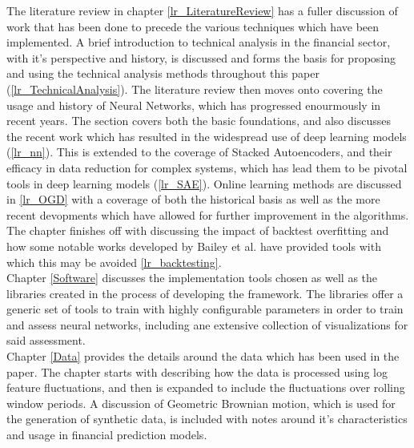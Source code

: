 \documentclass[a4paper,11pt,oneside]{article}
\theoremstyle{plain}
\theoremstyle{definition}
\begin{document}
	The literature review in chapter \ref{lr_LiteratureReview} has a fuller discussion of work that has been done to precede the various techniques which have been implemented. A brief introduction to technical analysis in the financial sector, with it's perspective and history, is discussed and forms the basis for proposing and using the technical analysis methods throughout this paper (\ref{lr_TechnicalAnalysis}). The literature review then moves onto covering the usage and history of Neural Networks, which has progressed enourmously in recent years. The section covers both the basic foundations, and also discusses the recent work which has resulted in the widespread use of deep learning models (\ref{lr_nn}). This is extended to the coverage of Stacked Autoencoders, and their efficacy in data reduction for complex systems, which has lead them to be pivotal tools in deep learning models (\ref{lr_SAE}). Online learning methods are discussed in \ref{lr_OGD} with a coverage of both the historical basis as well as the more recent devopments which have allowed for further improvement in the algorithms. The chapter finishes off with discussing the impact of backtest overfitting and how some notable works developed by Bailey et al. have provided tools with which this may be avoided \ref{lr_backtesting}.
	~\\\newline
	Chapter \ref{Software} discusses the implementation tools chosen as well as the libraries created in the process of developing the framework. The libraries offer a generic set of tools to train with highly configurable parameters in order to train and assess neural networks, including ane extensive collection of visualizations for said assessment.
	~\\\newline
	Chapter \ref{Data} provides the details around the data which has been used in the paper. The chapter starts with describing how the data is processed using log feature fluctuations, and then is expanded to include the fluctuations over rolling window periods. A discussion of Geometric Brownian motion, which is used for the generation of synthetic data, is included with notes around it's characteristics and usage in financial prediction models.
	~\\\newline
\end{document}
